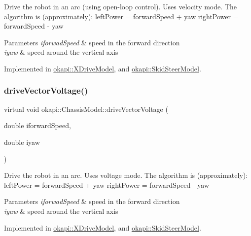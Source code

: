 Drive the robot in an arc (using open-\/loop control). Uses velocity mode. The algorithm is (approximately)\+: left\+Power = forward\+Speed + yaw right\+Power = forward\+Speed -\/ yaw


\begin{DoxyParams}{Parameters}
{\em iforwad\+Speed} & speed in the forward direction \\
\hline
{\em iyaw} & speed around the vertical axis \\
\hline
\end{DoxyParams}


Implemented in \mbox{\hyperlink{classokapi_1_1XDriveModel_ab36e677deea155bf9a691090f4b0f590}{okapi\+::\+X\+Drive\+Model}}, and \mbox{\hyperlink{classokapi_1_1SkidSteerModel_a5fa39473f6a6d2deae988f63e972b66a}{okapi\+::\+Skid\+Steer\+Model}}.

\mbox{\label{classokapi_1_1ChassisModel_a69115758be9e29888dce34f317d57150}} 
\subsubsection{\texorpdfstring{driveVectorVoltage()}{driveVectorVoltage()}}
{\footnotesize\ttfamily virtual void okapi\+::\+Chassis\+Model\+::drive\+Vector\+Voltage (\begin{DoxyParamCaption}\item[{double}]{iforward\+Speed,  }\item[{double}]{iyaw }\end{DoxyParamCaption})\hspace{0.3cm}{\ttfamily [pure virtual]}}

Drive the robot in an arc. Uses voltage mode. The algorithm is (approximately)\+: left\+Power = forward\+Speed + yaw right\+Power = forward\+Speed -\/ yaw


\begin{DoxyParams}{Parameters}
{\em iforwad\+Speed} & speed in the forward direction \\
\hline
{\em iyaw} & speed around the vertical axis \\
\hline
\end{DoxyParams}


Implemented in \mbox{\hyperlink{classokapi_1_1XDriveModel_a2a066629991985282b8205af6b03d9f6}{okapi\+::\+X\+Drive\+Model}}, and \mbox{\hyperlink{classokapi_1_1SkidSteerModel_aa9b68af25f8f924117b07a5c8e9f6c93}{okapi\+::\+Skid\+Steer\+Model}}.

